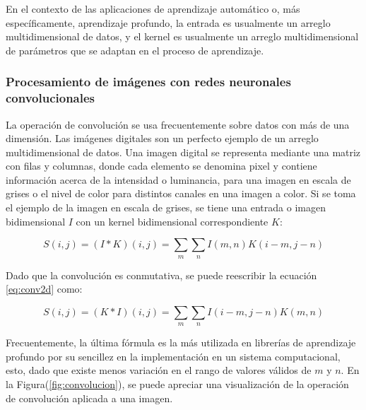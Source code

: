         En el contexto de las aplicaciones de aprendizaje automático o, más específicamente, aprendizaje profundo,
        la entrada es usualmente un arreglo multidimensional de datos, y el kernel es usualmente un arreglo 
        multidimensional de parámetros que se adaptan en el proceso de aprendizaje. 

        \subsubsection{Procesamiento de imágenes con redes neuronales convolucionales}
        La operación de convolución se usa frecuentemente sobre datos con más de una dimensión. Las imágenes digitales 
        son un perfecto ejemplo de un arreglo multidimensional de datos. Una imagen digital se representa mediante una
        matriz con filas y columnas, donde cada elemento se denomina pixel y contiene información acerca de la intensidad
        o luminancia, para una imagen en escala de grises o el nivel de color para distintos canales en una imagen a color.
        Si se toma el ejemplo de la imagen en escala de grises, se tiene una entrada o imagen bidimensional $I$ con un
        kernel bidimensional correspondiente $K$:

        \begin{equation} \label{eq:conv2d}
            S(i,j)=(I\ast K)(i,j) = \sum_{m} \sum_{n} I(m,n)K(i-m,j-n)
        \end{equation}

        Dado que la convolución es conmutativa, se puede reescribir la ecuación \ref{eq:conv2d} como:

        \begin{equation}
            S(i,j)=(K\ast I)(i,j) = \sum_{m} \sum_{n} I(i-m,j-n)K(m,n)
        \end{equation}

        Frecuentemente, la última fórmula es la más utilizada en librerías de aprendizaje profundo 
        por su sencillez en la implementación en un sistema computacional, esto, dado que existe menos 
        variación en el rango de valores válidos de $m$ y $n$. En la Figura(\ref{fig:convolucion}), se 
        puede apreciar una visualización de la operación de convolución aplicada a una imagen. 


